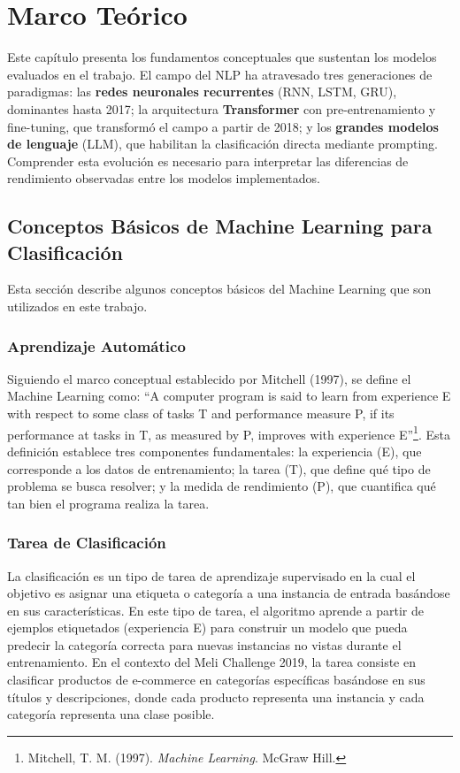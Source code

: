 \documentclass[11pt,a4paper]{article}
\begin{document}
\section{Marco Teórico}

Este capítulo presenta los fundamentos conceptuales que sustentan los modelos evaluados en el trabajo. El campo del NLP ha atravesado tres generaciones de paradigmas: las \textbf{redes neuronales recurrentes} (RNN, LSTM, GRU), dominantes hasta 2017; la arquitectura \textbf{Transformer} con pre-entrenamiento y fine-tuning, que transformó el campo a partir de 2018; y los \textbf{grandes modelos de lenguaje} (LLM), que habilitan la clasificación directa mediante prompting. Comprender esta evolución es necesario para interpretar las diferencias de rendimiento observadas entre los modelos implementados.

\subsection{Conceptos Básicos de Machine Learning para Clasificación}

Esta sección describe algunos conceptos básicos del Machine Learning que son utilizados en este trabajo.

\subsubsection{Aprendizaje Automático}

Siguiendo el marco conceptual establecido por Mitchell (1997), se define el Machine Learning como: ``A computer program is said to learn from experience E with respect to some class of tasks T and performance measure P, if its performance at tasks in T, as measured by P, improves with experience E''\footnote{Mitchell, T. M. (1997). \textit{Machine Learning}. McGraw Hill.}. Esta definición establece tres componentes fundamentales: la experiencia (E), que corresponde a los datos de entrenamiento; la tarea (T), que define qué tipo de problema se busca resolver; y la medida de rendimiento (P), que cuantifica qué tan bien el programa realiza la tarea.

\subsubsection{Tarea de Clasificación}

La clasificación es un tipo de tarea de aprendizaje supervisado en la cual el objetivo es asignar una etiqueta o categoría a una instancia de entrada basándose en sus características. En este tipo de tarea, el algoritmo aprende a partir de ejemplos etiquetados (experiencia E) para construir un modelo que pueda predecir la categoría correcta para nuevas instancias no vistas durante el entrenamiento. En el contexto del Meli Challenge 2019, la tarea consiste en clasificar productos de e-commerce en categorías específicas basándose en sus títulos y descripciones, donde cada producto representa una instancia y cada categoría representa una clase posible.
\end{document}
